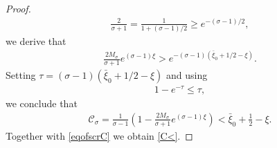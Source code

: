 \documentclass{article}
\theoremstyle{definition} \theoremstyle{remark}
\numberwithin{equation}{section}
\begin{document}
\begin{proof}
\begin{align*}
			\frac{2}{\sigma + 1} = \frac{1}{1 + (\sigma-1)/2} \ge e^{-(\sigma - 1)/2},
		\end{align*}
		we derive that
		\begin{align*}
			\frac{2M_\sigma}{\sigma + 1}e^{(\sigma - 1)\xi} > e^{-(\sigma - 1)(\bar\xi_0 + 1/2 - \xi)}.
		\end{align*}
		Setting $\tau = (\sigma - 1)(\bar\xi_0 + 1/2 - \xi)$ and using
		\begin{align*}
			1 - e^{-\tau} \le \tau,
		\end{align*}
		we conclude that
		\begin{align*}
			\mathscr{C}_\sigma = \frac{1}{\sigma-1}\left(1 - \frac{2M_\sigma}{\sigma + 1}e^{(\sigma - 1)\xi}\right) < \bar\xi_0 + \frac12 - \xi.
		\end{align*}
		Together with \eqref{eqofscrC} we obtain \eqref{C<}.


\end{proof}
\end{document}
